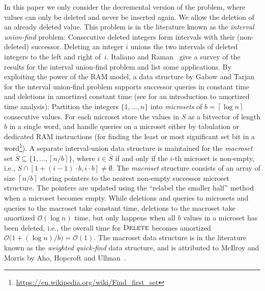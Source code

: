 \documentclass[a4paper]{lipics-v2021}
\newcommand{\Oh}{\mathcal{O}}
\newcommand{\ceil}[1]{\left\lceil #1\right\rceil}
\newcommand{\FuncName}[1]{\textup{\textsc{#1}}}
\newcommand{\Delete}{\FuncName{Delete}}
\begin{document}
In this paper we only consider the decremental version of the problem, where values can only be deleted and never be inserted again. We allow the deletion of an already deleted value. This problem is in the literature known as the \emph{interval union-find} problem: Consecutive deleted integers form intervals with their (non-deleted) successor. Deleting an integer $i$ unions the two intervals of deleted integers to the left and right of~$i$. Italiano and Raman~\cite[Chapter~5.3]{ItalianoRaman99} give a survey of the results for the interval union-find problem and list some applications. By exploiting the power of the RAM model, a data structure by Gabow and Tarjan~\cite{GabowTarjan85} for the interval union-find problem supports successor queries in constant time and deletions in amortized constant time (see \cite{Tarjan85} for an introduction to amortized time analysis): Partition the integers $\{1,\ldots,n\}$ into \emph{microsets} of $b=\ceil{\log n}$ consecutive values. For each microset store the values in $S$ as a bitvector of length $b$ in a single word, and handle queries on a microset either by tabulation or dedicated RAM instructions (for finding the least or most significant set bit in a word\footnote{\url{https://en.wikipedia.org/wiki/Find_first_set}}). A separate interval-union data structure is maintained for the \emph{macroset} set $\bar{S} \subseteq \{1,\ldots,\ceil{n/b}\}$, where $i \in \bar{S}$ if and only if the $i$-th microset is non-empty, i.e., $S \cap [1+(i-1)\cdot b,i\cdot b]\neq \emptyset$. The \emph{macroset} structure consists of an array of size $\ceil{n/b}$ storing pointers to the nearest non-empty successor microset structure. The pointers are updated using the ``relabel the smaller half'' method when a microset becomes empty. While deletions and queries to microsets and queries to the macroset take constant time, deletions to the macroset take amortized $\Oh(\log n)$ time, but only happens when all $b$ values in a microset has been deleted, i.e., the overall time for $\Delete$ becomes amortized $\Oh\big(1+(\log n)/b\big)=\Oh(1)$. The macroset data structure is in the literature known as the \emph{weighted quick-find} data structure, and is attributed to McIlroy and Morris by Aho, Hopcroft and Ullman~\cite{AhoHU74}.
\end{document}
